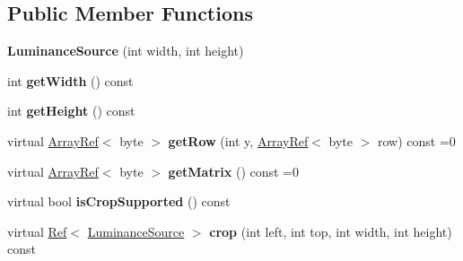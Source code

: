 \subsection*{Public Member Functions}
\begin{DoxyCompactItemize}
\item 
\mbox{\label{classzxing_1_1_luminance_source_a6b9b652b69e5b165c9abe68c563386bc}} 
{\bfseries Luminance\+Source} (int width, int height)
\item 
\mbox{\label{classzxing_1_1_luminance_source_a29a7ccb8a1c44ea20fd2544a19b8c5c1}} 
int {\bfseries get\+Width} () const
\item 
\mbox{\label{classzxing_1_1_luminance_source_a6c604fe9572f28dc9232e6777fdad6d0}} 
int {\bfseries get\+Height} () const
\item 
\mbox{\label{classzxing_1_1_luminance_source_a9812f778dae33c5d64af41c440d71b8b}} 
virtual \mbox{\hyperlink{classzxing_1_1_array_ref}{Array\+Ref}}$<$ byte $>$ {\bfseries get\+Row} (int y, \mbox{\hyperlink{classzxing_1_1_array_ref}{Array\+Ref}}$<$ byte $>$ row) const =0
\item 
\mbox{\label{classzxing_1_1_luminance_source_aa7988f67f8c6949534616c914ad817be}} 
virtual \mbox{\hyperlink{classzxing_1_1_array_ref}{Array\+Ref}}$<$ byte $>$ {\bfseries get\+Matrix} () const =0
\item 
\mbox{\label{classzxing_1_1_luminance_source_aad28110f6d902d15ede820fd16e046f9}} 
virtual bool {\bfseries is\+Crop\+Supported} () const
\item 
\mbox{\label{classzxing_1_1_luminance_source_acc1b9c15db446500591508ad8b6abe1c}} 
virtual \mbox{\hyperlink{classzxing_1_1_ref}{Ref}}$<$ \mbox{\hyperlink{classzxing_1_1_luminance_source}{Luminance\+Source}} $>$ {\bfseries crop} (int left, int top, int width, int height) const
\item 
\mbox{\label{classzxing_1_1_luminance_source_aa765635b7a22c76d636d4f9360d29b52}} 

\end{DoxyCompactItemize}

